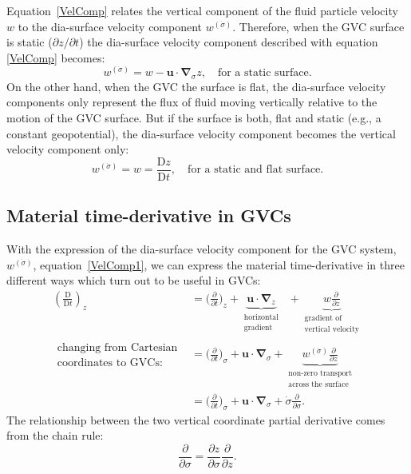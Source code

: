 Equation~\eqref{VelComp} relates the vertical component of the fluid particle velocity $w$ to the dia-surface velocity component $w^{(\dot{\sigma})}$. Therefore, when the GVC surface is static ($\partial z/\partial t$) the dia-surface velocity component described with equation \eqref{VelComp} becomes:
\begin{equation}
w^{(\dot{\sigma})} = w - \boldsymbol{u} \cdot \boldsymbol{\nabla}_\sigma z, \quad \text{for a static surface}.
\end{equation}
On the other hand, when the GVC the surface is flat, the dia-surface velocity components only represent the flux of fluid moving vertically relative to the motion of the GVC surface. But if the surface is both, flat and static (e.g., a constant geopotential), the dia-surface velocity component becomes the vertical velocity component only:
\begin{equation}
w^{(\dot{\sigma})} = w = \frac{\mathrm{D}z}{\mathrm{D}t}, \quad \text{for a static and flat surface}.
\end{equation}

\subsection{Material time-derivative in GVCs}

With the expression of the dia-surface velocity component for the GVC system, $w^{(\dot{\sigma})}$, equation~\eqref{VelComp1}, we can express the material time-derivative in three different ways which turn out to be useful in GVCs:
\begin{equation}
\begin{aligned}
\left(\frac{\mathrm{D}}{\mathrm{D}t}\right)_z & = \bigg (\frac{\partial}{\partial t} \bigg )_z + \underbrace{\boldsymbol{u} \cdot \boldsymbol{\nabla}_z}_{\substack{\text{horizontal}\\\text{gradient}}} \;\; +\!\!\!\! \underbrace{w\frac{\partial}{\partial z}}_{\substack{\text{gradient of}\\\text{vertical velocity}}} \\
\substack{\text{changing from Cartesian}\\\text{coordinates to GVCs:}}& =  \bigg (\frac{\partial}{\partial t} \bigg )_\sigma + \boldsymbol{u} \cdot \boldsymbol{\nabla}_\sigma + \underbrace{w^{(\dot{\sigma})}\frac{\partial}{\partial z}}_{\substack{\text{non-zero  transport}\\\text{across the surface}}} \\
& =  \bigg (\frac{\partial}{\partial t} \bigg )_\sigma + \boldsymbol{u} \cdot \boldsymbol{\nabla}_\sigma + \dot{\sigma}\frac{\partial}{\partial \sigma}.
\end{aligned}
\end{equation}
The relationship between  the two vertical coordinate partial derivative comes from the chain rule:
\begin{equation}
\frac{\partial}{\partial \sigma} = \frac{\partial z}{\partial \sigma} \frac{\partial}{\partial z}.
\end{equation}

